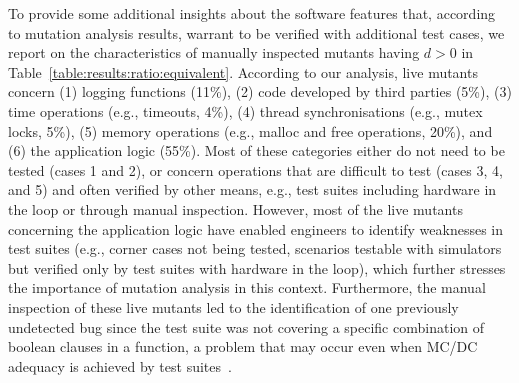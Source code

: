 To provide some additional insights about the software features that, according to \APPR mutation analysis results, 
warrant to be verified with additional test cases, we report on the characteristics of
manually inspected mutants having $d > 0$ in Table~\ref{table:results:ratio:equivalent}.
According to our analysis, live mutants concern (1) logging functions (11\%),  (2) code developed by third parties (5\%), (3) time operations (e.g., timeouts, 4\%), (4) thread synchronisations (e.g., mutex locks, 5\%), (5) memory operations (e.g., malloc and free operations, 20\%), and (6) the application logic (55\%). Most of these categories either do not need to be tested (cases 1 and 2), or concern operations that are difficult to test (cases 3, 4, and 5) and often verified by other means, e.g., test suites including hardware in the loop or through manual inspection. However, most of the live mutants concerning the application logic have enabled engineers to identify weaknesses  in test suites
(e.g., corner cases not being tested, scenarios testable with simulators but verified only by test suites with hardware in the loop), 
which further stresses the importance of mutation analysis in this context.
Furthermore, the manual inspection of these live mutants led to the identification of 
one previously undetected bug
 {since the test suite was not covering a specific combination of boolean clauses in a function, a problem that may occur even when MC/DC adequacy is achieved by test suites~\cite{Gay2016}.}


%
 

